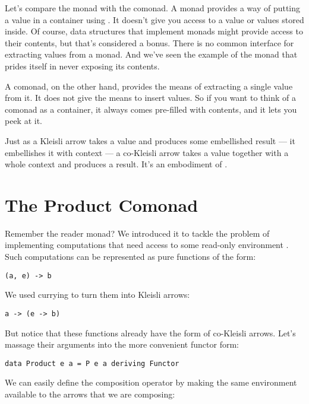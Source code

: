 Let's compare the monad with the comonad. A monad provides a way of
putting a value in a container using . It doesn't give
you access to a value or values stored inside. Of course, data
structures that implement monads might provide access to their contents,
but that's considered a bonus. There is no common interface for
extracting values from a monad. And we've seen the example of the
 monad that prides itself in never exposing its contents.

A comonad, on the other hand, provides the means of extracting a single
value from it. It does not give the means to insert values. So if you
want to think of a comonad as a container, it always comes pre-filled
with contents, and it lets you peek at it.

Just as a Kleisli arrow takes a value and produces some embellished
result --- it embellishes it with context --- a co-Kleisli arrow takes a
value together with a whole context and produces a result. It's an
embodiment of .

\section{The Product Comonad}\label{the-product-comonad}

Remember the reader monad? We introduced it to tackle the problem of
implementing computations that need access to some read-only environment
. Such computations can be represented as pure functions of
the form:

\begin{Verbatim}[commandchars=\\\{\}]
(a, e) -> b
\end{Verbatim}
We used currying to turn them into Kleisli arrows:

\begin{Verbatim}[commandchars=\\\{\}]
a -> (e -> b)
\end{Verbatim}
But notice that these functions already have the form of co-Kleisli
arrows. Let's massage their arguments into the more convenient functor
form:

\begin{Verbatim}[commandchars=\\\{\}]
data Product e a = P e a deriving Functor
\end{Verbatim}
We can easily define the composition operator by making the same
environment available to the arrows that we are composing:

